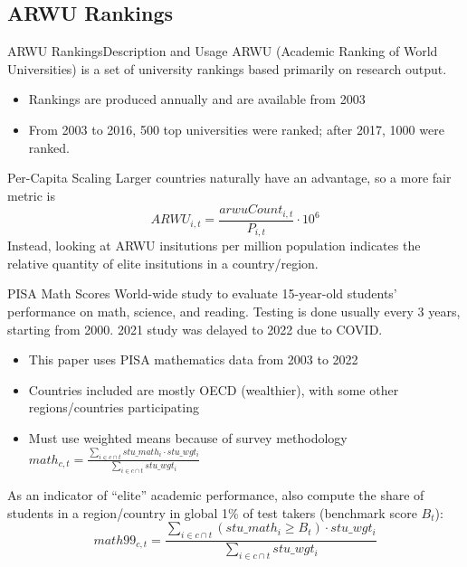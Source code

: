 \documentclass[10pt]{beamer}
\begin{document}
\subsection{ARWU Rankings}
\begin{frame}{ARWU Rankings}{Description and Usage}
    ARWU (Academic Ranking of World Universities) is a set of university rankings based primarily on research output.
    \begin{itemize}
        \item Rankings are produced annually and are available from 2003
        \item From 2003 to 2016, 500 top universities were ranked; after 2017, 1000 were ranked.
    \end{itemize}
    
    \begin{block}{Per-Capita Scaling}
        Larger countries naturally have an advantage, so a more fair metric is
        \[ARWU_{i,t} = \frac{arwuCount_{i,t}}{P_{i,t}} \cdot 10^6 \]
        Instead, looking at ARWU insitutions per million population indicates the relative quantity of elite insitutions in a country/region.
    \end{block}
    
\end{frame}

\begin{frame}{PISA Math Scores}
    World-wide study to evaluate 15-year-old students' performance on math, science, and reading. Testing is done usually every 3 years, starting from 2000. 2021 study was delayed to 2022 due to COVID.

    \begin{itemize}
        \item This paper uses PISA mathematics data from 2003 to 2022
        \item Countries included are mostly OECD (wealthier), with some other regions/countries participating
        \item Must use weighted means because of survey methodology $math_{c, t} = \frac{\sum_{i \in c \cap t} stu\_math_i \cdot stu\_wgt_i}{\sum_{i \in c \cap t} stu\_wgt_i}$
    \end{itemize}

    As an indicator of ``elite'' academic performance, also compute the share of students in a region/country in global 1\% of test takers (benchmark score $B_{t}$):
    \[math99_{c, t} = \frac{\sum_{i \in c \cap t} (stu\_math_i \geq B_t) \cdot stu\_wgt_i}{\sum_{i \in c \cap t} stu\_wgt_i}\]
\end{frame}
\end{document}
